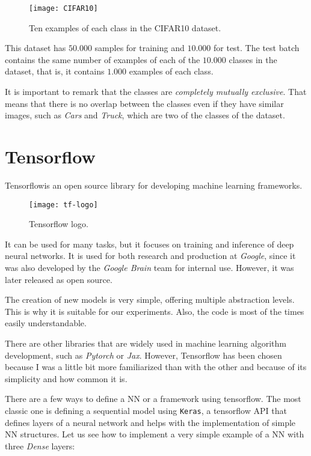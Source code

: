 \begin{figure}[H]
    \centering 
    \texttt{[image: CIFAR10]}
    \caption{Ten examples of each class in the CIFAR10 dataset. }
\end{figure}
This dataset has $50.000$ samples for training and $10.000$ for test. The test batch contains the same number of examples of each of the $10.000$ classes in the dataset, that is, it contains $1.000$ examples of each class. 

It is important to remark that the classes are \emph{completely mutually exclusive}. That means that there is no overlap between the classes even if they have similar images, such as \emph{Cars} and \emph{Truck}, which are two of the classes of the dataset.

\section{Tensorflow}



Tensorflow\footnotemark is an open source library for developing machine learning frameworks.  

\begin{wrapfigure}{r}{5cm}
    \caption{Tensorflow logo.}
    \texttt{[image: tf-logo]}
\end{wrapfigure}




It can be used for many tasks, but it focuses on training and inference of deep neural networks. It is used for both research and production at \emph{Google}, since it was also developed by the \emph{Google Brain} team for internal use. However, it was later released as open source.

The creation of new models is very simple, offering multiple abstraction levels. This is why it is suitable for our experiments. Also, the code is most of the times easily understandable.

There are other libraries that are widely used in machine learning algorithm development, such as \emph{Pytorch} or \emph{Jax}. However, Tensorflow has been chosen because I was a little bit more familiarized than with the other and because of its simplicity and how common it is. 

There are a few ways to define a NN or a framework using tensorflow. The most classic one is defining a sequential model using \lstinline{Keras}, a tensorflow API that defines layers of a neural network and helps with the implementation of simple NN structures. Let us see how to implement a very simple example of a NN with three \emph{Dense} layers: 

